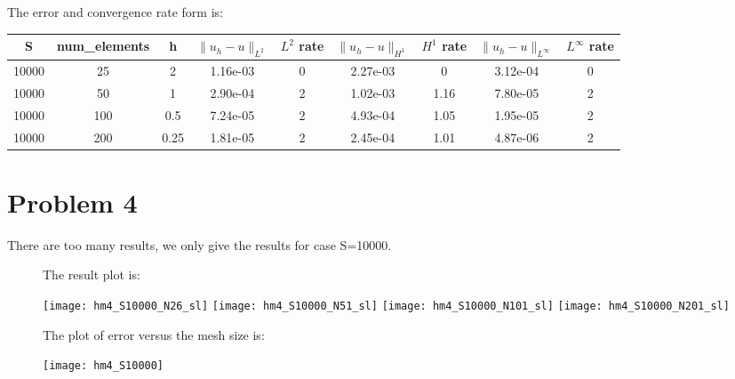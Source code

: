 \documentclass[11pt]{article}
\begin{document}
\begin{table}
	The error and convergence rate form is:\\
	\begin{center}
		\begin{tabular}{|c|c|c|c|c|c|c|c|c|} 
			\hline
			S & num\_elements  & h & $\|u_h-u\|_{L^{2}}$ & $L^{2}$ rate & $\|u_h-u\|_{H^{1}}$ & $H^{1}$ rate & $\|u_h-u\|_{L^{\infty}}$ & $L^{\infty}$ rate  \\ \hline
			10000 &  25   &   2  &  1.16e-03   &  0     &   2.27e-03 & 0 & 3.12e-04 & 0 \\
			10000 &  50   &   1 &  2.90e-04   &  2     &   1.02e-03 & 1.16 & 7.80e-05 & 2 \\
			10000 &  100   &   0.5  &  7.24e-05   &  2     &  4.93e-04 & 1.05 & 1.95e-05 & 2 \\
			10000 & 200   &   0.25  &  1.81e-05   &  2     &   2.45e-04 & 1.01 & 4.87e-06 & 2 \\
			\hline
		\end{tabular}
	\end{center}
\end{table}


\section{Problem 4}
There are too many results, we only give the results for case S=10000.\\ 
\begin{figure}
	The result plot is:\\
	\begin{center}
		\centering
		\texttt{[image: hm4\_S10000\_N26\_sl]}
		\texttt{[image: hm4\_S10000\_N51\_sl]}
		\texttt{[image: hm4\_S10000\_N101\_sl]}
		\texttt{[image: hm4\_S10000\_N201\_sl]}		
	\end{center}
	The plot of error versus the mesh size is:\\
	\begin{center}
		\centering
		\texttt{[image: hm4\_S10000]}	
	\end{center}
\end{figure}
\end{document}
